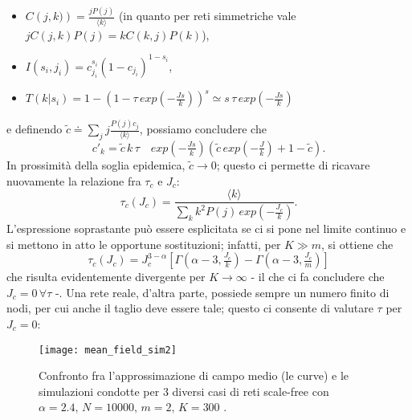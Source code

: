 \begin{itemize}
	\item $ C\left(j,k)\right) = \frac{j P\left(j\right)}{\langle k \rangle} $ (in quanto per reti simmetriche vale $ j C\left(j,k\right) P\left(j\right) = k C\left(k,j\right) P\left(k\right) $),
	\item $ I\left(s_i, j_i\right) = c_{j_i}^{s_i} \left(1 - c_{j_i}\right)^{1 - s_i} $,
	\item $ T\left(k|s_i\right) = 1 - \left(1 - \tau \, exp(- \tfrac{J s}{k})\right)^s \simeq s \, \tau \, exp(- \tfrac{J s}{k}) $
\end{itemize}
e definendo $ \tilde{c} \doteq \sum_j j \tfrac{P\left(j\right) c_j}{\langle k \rangle} $, possiamo concludere che \cite{Bagnoli2014}
\begin{equation}
	c'_k = \tilde{c} \, k \, \tau \quad exp(- \tfrac{J s}{k}) \left(\tilde{c} \, exp(- \tfrac{J}{k}) + 1 - \tilde{c}\right).
\end{equation}
In prossimità della soglia epidemica, $ \tilde{c} \to 0 $; questo ci permette di ricavare nuovamente la relazione fra $ \tau_c $ e $ J_c $:
\begin{equation}
	\tau_c\left(J_c\right) = \frac{\langle k \rangle}{\sum_k k^2 P\left(j\right) \, exp(-\tfrac{J_c}{k})}.
\end{equation}
L'espressione soprastante può essere esplicitata se ci si pone nel limite continuo e si mettono in atto le opportune sostituzioni; infatti, per $ K \gg m $, si ottiene che
\begin{equation}
	\tau_c \left(J_c \right) = J_{c}^{3 - \alpha} \left[ \Gamma \left( \alpha - 3, \tfrac{J_c}{k} \right) - \Gamma \left( \alpha - 3, \tfrac{J_c}{m}\right) \right] 	 
\end{equation}
che risulta evidentemente divergente per $ K \to \infty $ - il che ci fa concludere che $ J_c = 0 \, \forall \tau$ -. Una rete reale, d'altra parte, possiede sempre un numero finito di nodi, per cui anche il taglio deve essere tale; questo ci consente di valutare $ \tau $ per $ J_c = 0 $:
\begin{figure}[t]
		\begin{center}
			\texttt{[image: mean\_field\_sim2]}
			\caption{Confronto fra l'approssimazione di campo medio (le curve) e le simulazioni condotte per $ 3 $ diversi casi di reti scale-free con $ \alpha = 2.4, \, N = 10000, \, m = 2, \, K = 300 $ \cite{Bagnoli2014} .}
			\label{fig:sim2}
		\end{center}
\end{figure}

